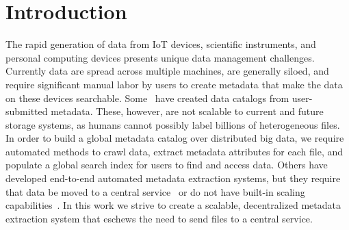 \documentclass[sigconf, 9pt]{acmart}
\begin{document}
\section{Introduction}

The rapid generation of data from IoT devices, scientific instruments, and personal computing devices presents unique 
data management challenges. Currently data are spread across multiple machines, are generally siloed, and require 
significant manual labor by users to create metadata that make the data on these devices searchable. Some~\cite{egan2003vizier, welter2013nhgri, irods, dataverse}  have created data catalogs from user-submitted metadata. These, however, are not scalable to current and future storage systems,
as humans cannot possibly label billions of heterogeneous files.   
In order to build a global metadata catalog over distributed big data, we require automated methods to crawl data, extract 
metadata attributes for each file, and populate a global search index for users to find and access data. Others have developed end-to-end 
automated metadata extraction systems, but they require that data be moved to a central service~\cite{skluzacek2018skluma, skluzacek2016klimatic, padhy2015brown, rodrigo2018sciencesearch} or do not have built-in scaling capabilities~\cite{mattmann2011tika}. 
In this work we strive to create a scalable, decentralized metadata extraction system that eschews the need to send files to a central service.  
\end{document}
